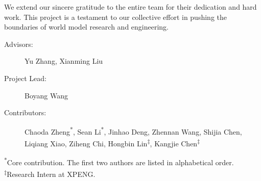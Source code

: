 \newcommand{\equalIT}{\textsuperscript{*}}
\newcommand{\internIT}{\textsuperscript{\ensuremath{\ddagger}}} 

We extend our sincere gratitude to the entire team for their dedication and hard work. This project is a testament to our collective effort in pushing the boundaries of world model research and engineering.

\vspace{1em}

\begin{description}
    \item[Advisors:] Yu Zhang, Xianming Liu
    \item[Project Lead:] Boyang Wang
    \item[Contributors:] Chaoda Zheng\equalIT, Sean Li\equalIT, Jinhao Deng, Zhennan Wang, Shijia Chen, Liqiang Xiao, Ziheng Chi, Hongbin Lin\internIT, Kangjie Chen\internIT
\end{description}


{\footnotesize
\noindent \equalIT Core contribution. The first two authors are listed in alphabetical order. \\
\internIT Research Intern at XPENG.}